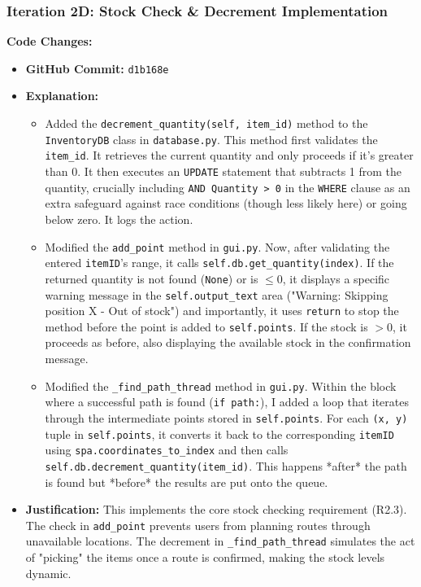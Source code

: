 \newpage

\subsubsection{Iteration 2D: Stock Check \& Decrement Implementation}

\textbf{Code Changes:}
\begin{itemize}
	\item \textbf{GitHub Commit:} \verb|d1b168e|
	\item \textbf{Explanation:}
	\begin{itemize}
		\item Added the \verb|decrement_quantity(self, item_id)| method to the \verb|InventoryDB| class in \verb|database.py|. This method first validates the \verb|item_id|. It retrieves the current quantity and only proceeds if it's greater than 0. It then executes an \verb|UPDATE| statement that subtracts 1 from the quantity, crucially including \verb|AND Quantity > 0| in the \verb|WHERE| clause as an extra safeguard against race conditions (though less likely here) or going below zero. It logs the action.
		\item Modified the \verb|add_point| method in \verb|gui.py|. Now, after validating the entered \verb|itemID|'s range, it calls \verb|self.db.get_quantity(index)|. If the returned quantity is not found (\verb|None|) or is $\le 0$, it displays a specific warning message in the \verb|self.output_text| area ("Warning: Skipping position X - Out of stock") and importantly, it uses \verb|return| to stop the method before the point is added to \verb|self.points|. If the stock is $>0$, it proceeds as before, also displaying the available stock in the confirmation message.
		\item Modified the \verb|_find_path_thread| method in \verb|gui.py|. Within the block where a successful path is found (\verb|if path:|), I added a loop that iterates through the intermediate points stored in \verb|self.points|. For each \verb|(x, y)| tuple in \verb|self.points|, it converts it back to the corresponding \verb|itemID| using \verb|spa.coordinates_to_index| and then calls \verb|self.db.decrement_quantity(item_id)|. This happens *after* the path is found but *before* the results are put onto the queue.
	\end{itemize}
	\item \textbf{Justification:} This implements the core stock checking requirement (R2.3). The check in \verb|add_point| prevents users from planning routes through unavailable locations. The decrement in \verb|_find_path_thread| simulates the act of "picking" the items once a route is confirmed, making the stock levels dynamic.
\end{itemize}

